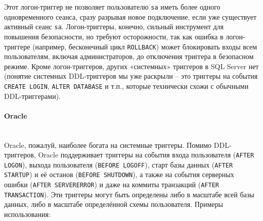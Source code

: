  Этот логон-триггер не позволяет пользователю \texttt{sa} иметь более одного одновременного сеанса, сразу разрывая новое подключение, если уже существует активный сеанс \texttt{sa}. Логон-триггеры, конечно, сильный инструмент для повышения безопасности, но требуют осторожности, так как ошибка в логон-триггере (например, бесконечный цикл \texttt{ROLLBACK}) может блокировать входы всем пользователям, включая администраторов, до отключения триггера в безопасном режиме. 
 Кроме логон-триггеров, других «системных» триггеров в SQL Server нет (понятие системных DDL-триггеров мы уже раскрыли – это триггеры на события \texttt{CREATE LOGIN}, \texttt{ALTER DATABASE} и т.п., которые технически схожи с обычными DDL-триггерами).

\paragraph{\textbf{Oracle}} ~\\
 Oracle, пожалуй, наиболее богата на системные триггеры. Помимо DDL-триггеров, Oracle поддерживает триггеры на события входа пользователя (\texttt{AFTER LOGON}), выхода пользователя (\texttt{BEFORE LOGOFF}), старт базы данных (\texttt{AFTER STARTUP}) и её останов (\texttt{BEFORE SHUTDOWN}), а также на события серверных ошибки (\texttt{AFTER SERVERERROR}) и даже на коммиты транзакций (\texttt{AFTER TRANSACTION}). Эти триггеры могут быть определены либо в масштабе всей базы данных, либо в масштабе определённой схемы пользователя. 
 Примеры использования:

